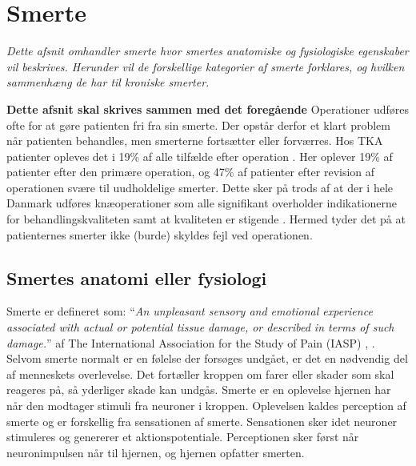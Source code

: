 \section{Smerte}
\textit{Dette afsnit omhandler smerte hvor smertes anatomiske og fysiologiske egenskaber vil beskrives. Herunder vil de forskellige kategorier af smerte forklares, og hvilken sammenhæng de har til kroniske smerter.}

\textbf{Dette afsnit skal skrives sammen med det foregående}
Operationer udføres ofte for at gøre patienten fri fra sin smerte. Der opstår derfor et klart problem når patienten behandles, men smerterne fortsætter eller forværres. Hos TKA patienter opleves det i 19\% af alle tilfælde efter operation \citep{Petersen2015}. Her oplever 19\% af patienter efter den primære operation, og 47\% af patienter efter revision af operationen svære til uudholdelige smerter. Dette sker på trods af at der i hele Danmark udføres knæoperationer som alle signifikant overholder indikationerne for behandlingskvaliteten samt at kvaliteten er stigende \citep{aarsrapport2016}. Hermed tyder det på at patienternes smerter ikke (burde) skyldes fejl ved operationen.


\subsection{Smertes anatomi eller fysiologi}

Smerte er defineret som: “\textit{An unpleasant sensory and emotional experience associated with actual or potential tissue damage, or described in terms of such damage.}” af The International Association for the Study of Pain (IASP) \citep{Giangregorio1997}, \citep{Carmon}.\\
Selvom smerte normalt er en følelse der forsøges undgået, er det en nødvendig del af menneskets overlevelse. Det fortæller kroppen om farer eller skader som skal reageres på, så yderliger skade kan undgås.
Smerte er en oplevelse hjernen har når den modtager stimuli fra neuroner i kroppen. Oplevelsen kaldes perception af smerte og er forskellig fra sensationen af smerte. Sensationen sker idet neuroner stimuleres og genererer et aktionspotentiale. Perceptionen sker først når neuronimpulsen når til hjernen, og hjernen opfatter smerten. 


